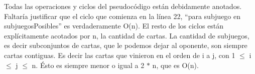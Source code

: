 \documentclass[11pt, a4paper, twoside]{article}
\begin{document}
{}

Todas las operaciones y ciclos del pseudocódigo están debidamente anotados. Faltaría justificar \fixme{} que el ciclo que comienza en la línea 22, ``para subjuego en subjuegosPosibles'' es verdaderamente O(n).
El resto de los ciclos están explícitamente acotados por n, la cantidad de cartas.
La cantidad de subjuegos, es decir subconjuntos de cartas, que le podemos dejar al oponente, son siempre cartas contiguas. Es decir las cartas que vinieron en el orden de i a j, con 1 $\leq$ i $\leq$ j $\leq$ n. Ésto es siempre menor o igual a 2 $*$ n, que es O(n).
\end{document}
